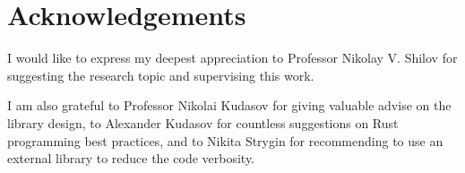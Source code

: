 \chapter{Acknowledgements}
\label{chap:ack}

I would like to express my deepest appreciation to Professor Nikolay V. Shilov for suggesting
the research topic and supervising this work.

I am also grateful to Professor Nikolai Kudasov for giving valuable advise on the library design,
to Alexander Kudasov for countless suggestions on Rust programming best practices, and
to Nikita Strygin for recommending to use an external library to reduce the code verbosity.
